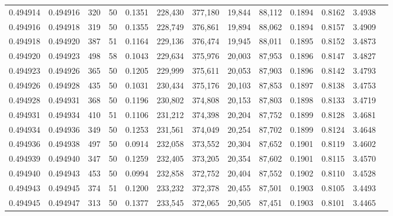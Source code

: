 \begin{tabular}{rrrrrrrrrrrrr}
0.494914 & 0.494916 &   320 &  50 &                                     0.1351 & 228,430 & 377,180 &  19,844 &  88,112 & 0.1894 & 0.8162 & 3.4938 \\
0.494916 & 0.494918 &   319 &  50 &                                     0.1355 & 228,749 & 376,861 &  19,894 &  88,062 & 0.1894 & 0.8157 & 3.4909 \\
0.494918 & 0.494920 &   387 &  51 &                                     0.1164 & 229,136 & 376,474 &  19,945 &  88,011 & 0.1895 & 0.8152 & 3.4873 \\
0.494920 & 0.494923 &   498 &  58 &                                     0.1043 & 229,634 & 375,976 &  20,003 &  87,953 & 0.1896 & 0.8147 & 3.4827 \\
0.494923 & 0.494926 &   365 &  50 &                                     0.1205 & 229,999 & 375,611 &  20,053 &  87,903 & 0.1896 & 0.8142 & 3.4793 \\
0.494926 & 0.494928 &   435 &  50 &                                     0.1031 & 230,434 & 375,176 &  20,103 &  87,853 & 0.1897 & 0.8138 & 3.4753 \\
0.494928 & 0.494931 &   368 &  50 &                                     0.1196 & 230,802 & 374,808 &  20,153 &  87,803 & 0.1898 & 0.8133 & 3.4719 \\
0.494931 & 0.494934 &   410 &  51 &                                     0.1106 & 231,212 & 374,398 &  20,204 &  87,752 & 0.1899 & 0.8128 & 3.4681 \\
0.494934 & 0.494936 &   349 &  50 &                                     0.1253 & 231,561 & 374,049 &  20,254 &  87,702 & 0.1899 & 0.8124 & 3.4648 \\
0.494936 & 0.494938 &   497 &  50 &                                     0.0914 & 232,058 & 373,552 &  20,304 &  87,652 & 0.1901 & 0.8119 & 3.4602 \\
0.494939 & 0.494940 &   347 &  50 &                                     0.1259 & 232,405 & 373,205 &  20,354 &  87,602 & 0.1901 & 0.8115 & 3.4570 \\
0.494940 & 0.494943 &   453 &  50 &                                     0.0994 & 232,858 & 372,752 &  20,404 &  87,552 & 0.1902 & 0.8110 & 3.4528 \\
0.494943 & 0.494945 &   374 &  51 &                                     0.1200 & 233,232 & 372,378 &  20,455 &  87,501 & 0.1903 & 0.8105 & 3.4493 \\
0.494945 & 0.494947 &   313 &  50 &                                     0.1377 & 233,545 & 372,065 &  20,505 &  87,451 & 0.1903 & 0.8101 & 3.4465 \\

\end{tabular}
